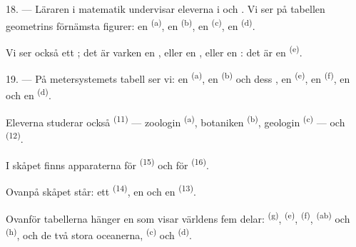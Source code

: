 18. --- Läraren i matematik undervisar eleverna i  och
. Vi ser på tabellen geometrins förnämsta figurer: en 
\textsuperscript{(a)}, en  \textsuperscript{(b)}, en 
\textsuperscript{(c)}, en
 \textsuperscript{(d)}.

Vi ser också ett ; det är varken en , eller en
, eller en : det är en
 \textsuperscript{(e)}.

19. --- På metersystemets tabell ser vi: en  \textsuperscript{(a)}, en
 \textsuperscript{(b)} och dess
, en  \textsuperscript{(e)}, en 
\textsuperscript{(f)}, en  och en  \textsuperscript{(d)}.

Eleverna studerar också  \textsuperscript{(11)} --- zoologin
\textsuperscript{(a)}, botaniken \textsuperscript{(b)}, geologin \textsuperscript{(c)} --- och
 \textsuperscript{(12)}.

I skåpet finns apparaterna för  \textsuperscript{(15)} och för
 \textsuperscript{(16)}.

Ovanpå skåpet står: ett  \textsuperscript{(14)}, en  och en
 \textsuperscript{(13)}.

Ovanför tabellerna hänger en  som visar världens fem delar:
 \textsuperscript{(g)},  \textsuperscript{(e)},
 \textsuperscript{(f)}, 
\textsuperscript{(ab)} och  \textsuperscript{(h)}, och de två stora
oceanerna,  \textsuperscript{(c)} och
 \textsuperscript{(d)}.
\VUsaut{6.0mm}
\VUfilet{22mm}
